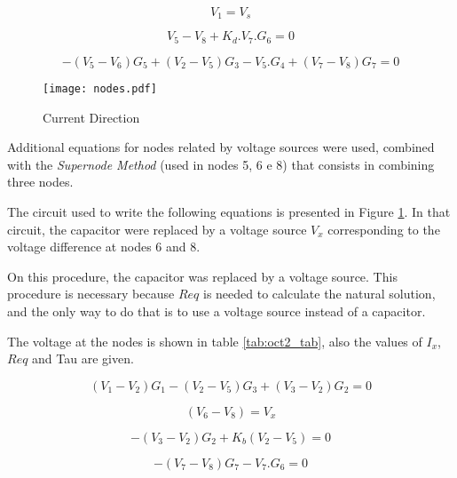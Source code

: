 \begin{equation}
  V_1 = V_s
  \label{eq_5}
\end{equation}

\begin{equation}
  V_5 - V_8 + K_d . V_7 . G_6 = 0
  \label{eq_6}
\end{equation}

\begin{equation}
  - (V_5 - V_6) G_5 + (V_2 - V_5) G_3 - V_5 . G_4 + (V_7 - V_8) G_7 = 0
  \label{eq_7}
\end{equation}


\begin{figure}[h] \centering
\texttt{[image: nodes.pdf]}
\caption{Current Direction}
\label{fig:nodes}
\end{figure}


\newpage


Additional equations for nodes related by voltage sources were used, combined with the \textit{Supernode Method} (used in nodes 5, 6 e 8) that consists in combining three nodes.

The circuit used to write the following equations is presented in Figure \ref{fig:nodes}. In that circuit, the capacitor were replaced by a voltage source $V_x$ corresponding to the voltage difference at nodes 6 and 8.

On this procedure, the capacitor was replaced by a voltage source. This procedure is necessary because $Req$ is needed to calculate the natural solution, and the only way  to do that is to use a voltage source instead of a capacitor.  

The voltage at the nodes is shown in table \ref{tab:oct2_tab}, also the values of $I_x$, $Req$ and Tau are given.


\begin{equation}
  (V_1 - V_2) G_1 - (V_2 - V_5) G_3 + (V_3 - V_2) G_2 = 0
  \label{eq_8}
\end{equation}

\begin{equation}
  (V_6 - V_8) = V_x
  \label{eq_9}
\end{equation}

\begin{equation}
  - (V_3 - V_2) G_2 + K_b (V_2 - V_5) = 0
  \label{eq_10}
\end{equation}

\begin{equation}
  - (V_7 - V_8) G_7 - V_7 . G_6 = 0
  \label{eq_11}
\end{equation}

